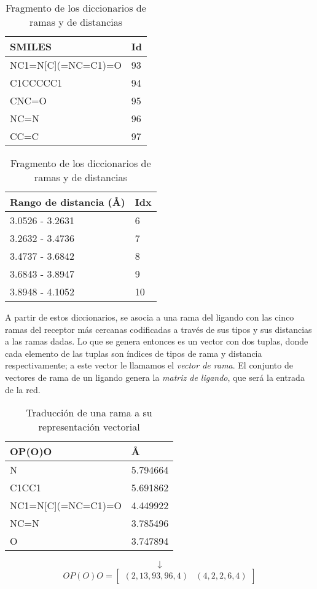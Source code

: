 \begin{table}[H]
  \begin{center}
    \begin{tabular}{l|l}
      SMILES                 & Id \\ \hline
      NC1=N{[}C{]}(=NC=C1)=O & 93 \\
      C1CCCCC1               & 94 \\
      CNC=O                  & 95 \\
      NC=N                   & 96 \\
      CC=C                   & 97
    \end{tabular}
    \begin{tabular}{l|l}
      Rango de distancia (\AA) & Idx \\ \hline
      3.0526 - 3.2631        & 6   \\
      3.2632 - 3.4736        & 7   \\
      3.4737 - 3.6842        & 8   \\
      3.6843 - 3.8947        & 9   \\
      3.8948 - 4.1052        & 10
    \end{tabular}
  \end{center}
  \caption{Fragmento de los diccionarios de ramas y de distancias}
  \label{fig:dictionary}
\end{table}

A partir de estos diccionarios, se asocia a una rama del ligando con
las cinco ramas del receptor más cercanas codificadas a través de sus
tipos y sus distancias a las ramas dadas. Lo que se genera entonces es
un vector con dos tuplas, donde cada elemento de las tuplas son
índices de tipos de rama y distancia respectivamente; a este vector le
llamamos el \textit{vector de rama}. El conjunto de vectores de rama
de un ligando genera la \textit{matriz de ligando}, que será la
entrada de la red.

\begin{table}[H]
  \begin{center}
  \begin{tabular}{l|l}
    OP(O)O & \AA \\ \hline N & 5.794664 \\ C1CC1 & 5.691862
    \\ NC1=N{[}C{]}(=NC=C1)=O & 4.449922 \\ NC=N & 3.785496 \\ O &
    3.747894
  \end{tabular}
  \end{center}
  \begin{equation*}
  \downarrow
  \end{equation*}
  \begin{equation*}
    OP(O)O=\begin{bmatrix}
    (2, 13, 93, 96, 4) & (4, 2, 2, 6, 4)
    \end{bmatrix}
  \end{equation*}
  \caption{Traducción de una rama a su representación vectorial}
\end{table}

